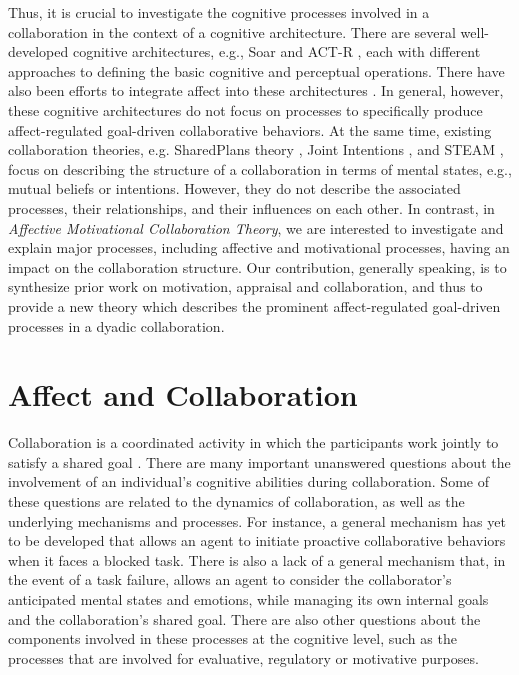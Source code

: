 \documentclass[letterpaper]{article}
\begin{document}
Thus, it is crucial to investigate the cognitive processes involved in a
collaboration in the context of a cognitive architecture. There are several
well-developed cognitive architectures, e.g., Soar \cite{laird:soar} and ACT-R
\cite{anderson:act-r}, each with different approaches to defining the basic
cognitive and perceptual operations. There have also been efforts to integrate
affect into these architectures \cite{marinier:behavior-emotion}. In general,
however, these cognitive architectures do not focus on processes to specifically
produce affect-regulated goal-driven collaborative behaviors. At the same time,
existing collaboration theories, e.g. SharedPlans theory
\cite{grosz:plans-discourse}, Joint Intentions \cite{cohen:teamwork}, and STEAM
\cite{tambe:flexible-teamwork}, focus on describing the structure of a
collaboration in terms of mental states, e.g., mutual beliefs or intentions.
However, they do not describe the associated processes, their relationships, and
their influences on each other. In contrast, in \textit{Affective Motivational
Collaboration Theory}, we are interested to investigate and explain major
processes, including affective and motivational processes, having an impact on
the collaboration structure. Our contribution, generally speaking, is to
synthesize prior work on motivation, appraisal and collaboration, and thus to
provide a new theory which describes the prominent affect-regulated goal-driven
processes in a dyadic collaboration.

\vspace*{-3mm}
\section{Affect and Collaboration}

Collaboration is a coordinated activity in which the participants work jointly
to satisfy a shared goal \cite{grosz:plans-discourse}. There are many important
unanswered questions about the involvement of an individual's cognitive
abilities during collaboration. Some of these questions are related to the
dynamics of collaboration, as well as the underlying mechanisms and processes.
For instance, a general mechanism has yet to be developed that allows an agent
to initiate proactive collaborative behaviors when it faces a blocked task.
There is also a lack of a general mechanism that, in the event of a task
failure, allows an agent to consider the collaborator's anticipated mental
states and emotions, while managing its own internal goals and the
collaboration's shared goal. There are also other questions about the components
involved in these processes at the cognitive level, such as the processes that
are involved for evaluative, regulatory or motivative purposes.
\end{document}
